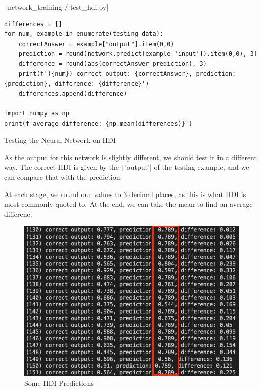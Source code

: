 \documentclass[12pt]{report}
\newcommand{\pil}[1]{\protect\texttt|#1|}
\begin{document}
\begin{listing}[H]
\pil{network_training / test_hdi.py}
\begin{verbatim}
differences = []
for num, example in enumerate(testing_data):
    correctAnswer = example["output"].item(0,0)
    prediction = round(network.predict(example['input']).item(0,0), 3)
    difference = round(abs(correctAnswer-prediction), 3)
    print(f'({num}) correct output: {correctAnswer}, prediction: {prediction}, difference: {difference}')
    differences.append(difference)

import numpy as np
print(f'average difference: {np.mean(differences)}')
\end{verbatim}
\caption{Testing the Neural Network on HDI}\label{cs:testHDI}
\end{listing}

As the output for this network is slightly different, we should test it in a different way. The correct HDI is given by the \pil{'output'} of the testing example, and we can compare that with the prediction.

At each stage, we round our values to 3 decimal places, as this is what HDI is most commonly quoted to. At the end, we can take the mean to find an average differene.

\begin{center}
\end{center}

\begin{figure}[H]
\centering
\includegraphics[width=13cm]{ss10.1.png}
\caption{Some HDI Predictions}\label{fig:ss10.1}
\end{figure}
\end{document}
